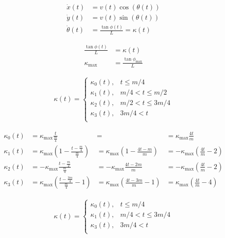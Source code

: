 \documentclass{article}
\begin{document}
\begin{align}
  \dot{x}\left(t\right) &= v\left(t\right)\cos\left(\theta\left(t\right)\right)\\
  \dot{y}\left(t\right) &= v\left(t\right)\sin\left(\theta\left(t\right)\right)\\
  \dot{\theta}\left(t\right) &= \frac{\tan \phi\left(t\right)}{L} = \kappa\left(t\right)
\end{align}

\begin{align}
  \frac{\tan \phi\left(t\right)}{L} &= \kappa\left(t\right)\\
  \kappa_{\max} &= \frac{\tan \phi_{\max}}{L}
\end{align}

\begin{align}
  \kappa\left(t\right) = \left\{
    \begin{array}{cc}
      \kappa_{0}\left(t\right),   & t \le m/4\\
      \kappa_{1}\left(t\right),   & m/4 < t \le m/2\\
      \kappa_{2}\left(t\right), & m/2 < t \le 3m/4\\
      \kappa_{3}\left(t\right), & 3m/4 < t\\
    \end{array}
  \right.
\end{align}

\begin{align}
  \kappa_{0}\left(t\right) &= \kappa_{\max}\frac{t}{\frac{m}{4}} &= &=\kappa_{\max}\frac{4t}{m}\\
  \kappa_{1}\left(t\right) &= \kappa_{\max}\left(1-\frac{t-\frac{m}{4}}{\frac{m}{4}}\right) &= \kappa_{\max}\left(1-\frac{4t-m}{m}\right) &= -\kappa_{\max}\left(\frac{4t}{m}-2\right)\\
  \kappa_{2}\left(t\right) &= -\kappa_{\max}\frac{t-\frac{m}{2}}{\frac{m}{4}} &= -\kappa_{\max}\frac{4t-2m}{m} &= -\kappa_{\max}\left(\frac{4t}{m}-2\right)\\
  \kappa_{3}\left(t\right) &= \kappa_{\max}\left(\frac{t-\frac{3m}{4}}{\frac{m}{4}}-1\right) &=  \kappa_{\max}\left(\frac{4t-3m}{m}-1\right) &= \kappa_{\max}\left(\frac{4t}{m}-4\right)
\end{align}

\begin{align}
  \kappa\left(t\right) = \left\{
    \begin{array}{cc}
      \kappa_{0}\left(t\right),   & t \le m/4\\
      \kappa_{1}\left(t\right),   & m/4 < t \le 3m/4\\
      \kappa_{3}\left(t\right), & 3m/4 < t\\
    \end{array}
  \right.
\end{align}
\end{document}
